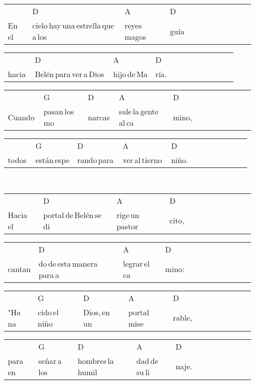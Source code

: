 \begin{multicols}{2}
\noindent
\begin{minipage}{\columnwidth}
\noindent
\noindent
\begin{tabular}{llllllllllll}
&D&A&D\\
En\,el\,&cielo\,hay\,una\,estrella\,que\,a\,los\,&reyes\,magos\,&guía
\end{tabular}

\noindent
\begin{tabular}{llllllllllll}
&D&A&D\\
hacia\,&Belén\,para\,ver\,a\,Dios\,&hijo\,de\,Ma&ría.
\end{tabular}

\noindent
\begin{tabular}{llllllllllll}
&G&D&A&D\\
Cuando\,&pasan\,los\,mo&narcas\,&sale\,la\,gente\,al\,ca&mino,
\end{tabular}

\noindent
\begin{tabular}{llllllllllll}
&G&D&A&D\\
todos\,&están\,espe&rando\,para\,&ver\,al\,tierno\,&niño.
\end{tabular}
\end{minipage}\\


\chorus{}

\noindent
\begin{minipage}{\columnwidth}
\noindent
\noindent
\begin{tabular}{llllllllllll}
&D&A&D\\
Hacia\,el\,&portal\,de\,Belén\,se\,di&rige\,un\,pastor&cito,
\end{tabular}

\noindent
\begin{tabular}{llllllllllll}
&D&A&D\\
cantan&do\,de\,esta\,manera\,para\,a&legrar\,el\,ca&mino:
\end{tabular}

\noindent
\begin{tabular}{llllllllllll}
&G&D&A&D\\
"Ha\,na&cido\,el\,niño\,&Dios,\,en\,un\,&portal\,mise&rable,
\end{tabular}

\noindent
\begin{tabular}{llllllllllll}
&G&D&A&D\\
para\,en&señar\,a\,los\,&hombres\,la\,humil&dad\,de\,su\,li&naje.
\end{tabular}
\end{minipage}\\


\end{multicols}
